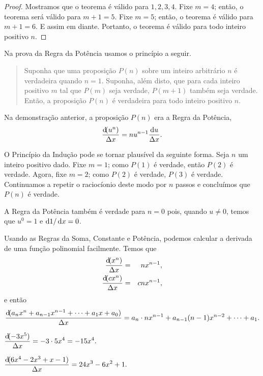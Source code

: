 \begin{proof}
Mostramos que o teorema é válido para $1, 2, 3, 4$. Fixe $m = 4$; então,
o teorema será válido para $m + 1 = 5$. Fixe $m = 5$; então, o teorema é
válido para $m + 1 = 6$. E assim em diante. Portanto, o teorema é válido
para todo inteiro positivo $n$.
\end{proof}

Na prova da Regra da Potência usamos o princípio a seguir.


\begin{quote}
       Suponha que uma proposição $P(n)$ sobre um inteiro arbitrário $n$
       é verdadeira quando $n = 1$. Suponha, além disto, que para cada
       inteiro positivo $m$ tal que $P(m)$ seja verdade, $P(m+1)$ também
       seja verdade. Então, a proposição $P(n)$ é verdadeira para todo
       inteiro positivo $n$.
\end{quote}

Na demonstração anterior, a proposição $P(n)$ era a Regra da Potência,
$$
  \frac{\dif(u^n)}{\dx} = n u^{n-1} \frac{\du}{\dx}.
$$

O Princípio da Indução pode se tornar plausível da seguinte forma. Seja $n$
um inteiro positivo dado. Fixe $m = 1$; como $P(1)$ é verdade, então $P(2)$
é verdade. Agora, fixe $m = 2$; como $P(2)$ é verdade, $P(3)$ é verdade.
Continuamos a repetir o raciocíonio deste modo por $n$ passos e concluímos
que $P(n)$ é verdade.

A Regra da Potência também é verdade para $n = 0$ pois, quando $u \ne 0$,
temos que $u^0 = 1$ e $\dif 1/\dif x = 0$.

Usando as Regras da Soma, Constante e Potência, podemos calcular a derivada
de uma função polinomial facilmente. Temos que
\begin{eqnarray*}
  \frac{\dif(x^n)}{\dx} & = & n x^{n-1}, \\
  \frac{\dif(c x^n)}{\dx} & = & c n x^{n-1},
\end{eqnarray*}
e então
$$
  \frac{\dif(a_n x^n + a_{n-1} x^{n-1} + \cdots + a_1 x + a_0)}{\dx} =
    a_n \cdot n x^{n-1} + a_{n-1}(n-1)x^{n-2} + \cdots + a_1.
$$

\begin{example}
$\displaystyle
  \frac{\dif(-3x^5)}{\dx} = -3 \cdot 5x^4 = -15x^4.
$
\end{example}

\begin{example}
$\displaystyle
  \frac{\dif(6x^4 - 2x^3 + x - 1)}{\dx} = 24x^3 - 6x^2 + 1.
$
\end{example}

